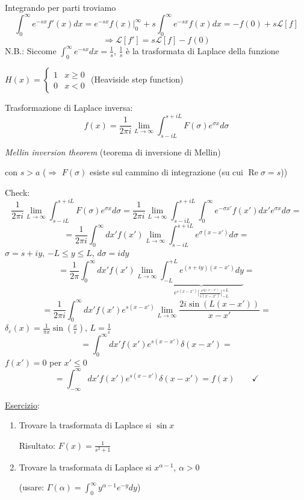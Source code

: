 \documentclass[a4paper,11pt]{report}
\begin{document}
Integrando per parti troviamo
\[
\int_0^{\infty} e^{-sx} f'(x) dx = e^{-sx} f(x)\Big|_0^\infty + s \int_0^{\infty} e^{-sx} f(x) dx = -f(0) + s\mathcal{L}[f]
\]
\begin{equation}
\Rightarrow \mathcal{L}[f'] = s\mathcal{L}[f] -f(0)
\tag{$\triangle$}
\label{eqtriangle}
\end{equation}
N.B.: Siccome $\int_0^{\infty} e^{-sx} dx = \frac{1}{s}$, $\frac{1}{s}$ \`e la trasformata di Laplace della funzione 

$H(x)=\begin{cases} 1 & x \geq 0 \\ 0 & x<0 \end{cases}$ (Heaviside step function)

\medskip

Trasformazione di Laplace inversa:
\[
f(x)=\frac{1}{2 \pi i} \lim_{L \to \infty} \int^{s+iL}_{s-iL}F(\sigma) e^{\sigma x} d\sigma
\]
\centerline{\emph{Mellin inversion theorem} (teorema di inversione di Mellin)}

con $s>a$ ($\Rightarrow$ $F(\sigma)$ esiste sul cammino di integrazione (su cui $\operatorname{Re}\sigma=s$))


\medskip

Check:
\[
\frac{1}{2 \pi i} \lim_{L \to \infty} \int^{s+iL}_{s-iL}F(\sigma) e^{\sigma x} d\sigma = \frac{1}{2 \pi i} \lim_{L \to \infty} \int^{s+iL}_{s-iL} \int_0^\infty e^{-\sigma x'} f(x') dx' e^{\sigma x} d\sigma =
\]
\[
=\frac{1}{2 \pi i} \int^\infty_0 dx' f(x') \lim_{L \to \infty} \int^{s+iL}_{s-iL} e^{\sigma (x-x')} d\sigma =
\]
$\sigma=s+iy$, $-L\leq y \leq L$, $d\sigma=i dy$
\[
=\frac{1}{2 \pi} \int^\infty_0 dx' f(x') \lim_{L \to \infty} \underbrace{\int^{+L}_{-L} e^{(s+iy)(x-x')} dy }_{e^{s(x-x')}\big[\frac{e^{iy(x-x')}}{i(x-x')}\big]^{+L}_{-L}}=
\]
\[
=\frac{1}{2 \pi i} \int^\infty_0 dx' f(x') e^{s (x-x')} \lim_{L \to \infty} \frac{2 i \sin(L(x-x'))}{x-x'}=
\]
$\delta_\varepsilon(x)=\frac{1}{\pi x} \sin(\frac{x}{\varepsilon})$, $L=\frac{1}{\varepsilon}$
\[
=\int_0^\infty dx' f(x') e^{s (x-x')} \delta(x-x')=
\]
$f(x')=0$ per $x'\leq0$
\[
=\int_{-\infty}^\infty dx' f(x') e^{s (x-x')} \delta(x-x')=f(x) \qquad \checkmark
\]

\medskip

\underline{Esercizio}:
\begin{enumerate}
\item Trovare la trasformata di Laplace si $\sin x$

Risultato: $F(x)=\frac{1}{s^2+1}$
\item Trovare la trasformata di Laplace si $x^{\alpha -1}$, $\alpha>0$

(usare: $\Gamma(\alpha)=\int_0^{\infty} y^{\alpha -1} e^{-y} dy$)
\end{enumerate}
\end{document}
